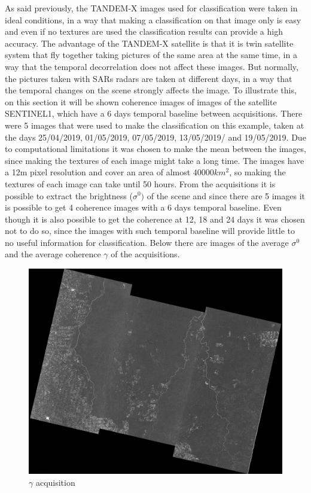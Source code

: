 As said previously, the TANDEM-X images used for classification were taken in ideal conditions, in a way that making a classification on that image only is easy and even if no textures are used the classification results can provide a high accuracy. \newline
The advantage of the TANDEM-X satellite is that it is twin satellite system that fly together taking pictures of the same area at the same time, in a way that the temporal decorrelation does not affect these images. \newline
But normally, the pictures taken with SARs radars are taken at different days, in a way that the temporal changes on the scene strongly affects the image. \newline
To illustrate this, on this section it will be shown coherence images of images of the satellite SENTINEL1, which have a 6 days temporal baseline between acquisitions. There were 5 images that were used to make the classification on this example, taken at the days 25/04/2019, 01/05/2019, 07/05/2019, 13/05/2019/ and 19/05/2019. Due to computational limitations it was chosen to make the mean between the images, since making the textures of each image might take a long time. The images have a 12m pixel resolution and cover an area of almost $40000km^2$, so making the textures of each image can take until 50 hours. \newline
From the acquisitions it is possible to extract the brightness ($\sigma^0)$ of the scene and since there are 5 images it is possible to get 4 coherence images with a 6 days temporal baseline. Even though it is also possible to get the coherence at 12, 18 and 24 days it was chosen not to do so, since the images with such temporal baseline will provide little to no useful information for classification.
Below there are images of the average $\sigma^0$ and the average coherence $\gamma$ of the acquisitions.
\begin{figure}[H]
    \centering
    \includegraphics[width=0.75\linewidth]{Chapter5/SENTINEL1/geo_cohimage.pdf}
    \caption{$\gamma$ acquisition}
    \label{fig:gamma_sentinel}
\end{figure}{}

